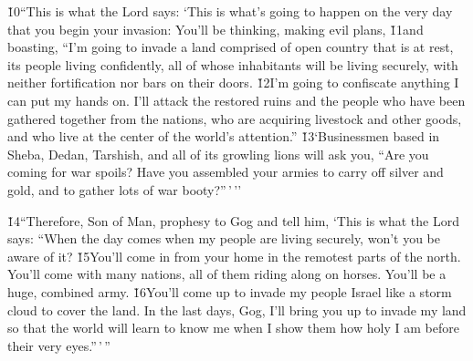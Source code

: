 \v{10}``This is what the Lord  says: `This is what's going to happen on the very day that you begin your invasion: You'll be thinking, making evil plans, \v{11}and boasting, ``I'm going to invade a land comprised of open country that is at rest, its people living confidently, all of whose inhabitants will be living securely, with neither fortification nor bars on their doors. \v{12}I'm going to confiscate anything I can put my hands on. I'll attack the restored ruins and the people who have been gathered together from the nations, who are acquiring livestock and other goods, and who live at the center of the world's attention.'' \v{13}`Businessmen based in Sheba, Dedan, Tarshish, and all of its growling lions will ask you, ``Are you coming for war spoils? Have you assembled your armies to carry off silver and gold, and to gather lots of war booty?''\,'\,''

\v{14}``Therefore, Son of Man, prophesy to Gog and tell him, `This is what the Lord  says: ``When the day comes when my people are living securely, won't you be aware of it? \v{15}You'll come in from your home in the remotest parts of the north. You'll come with many nations, all of them riding along on horses. You'll be a huge, combined army. \v{16}You'll come up to invade my people Israel like a storm cloud to cover the land. In the last days, Gog, I'll bring you up to invade my land so that the world will learn to know me when I show them how holy I am before their very eyes.''\,'\,''

